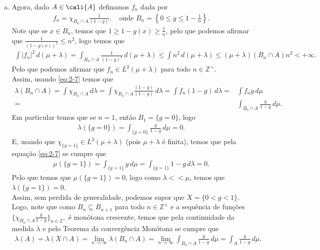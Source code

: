 \begin{homeworkProblem}[7]
\begin{solution}
\begin{enumerate}[a)]
      Assim, concluimos que $0\leq g\leq 1$ $\lambda$-q.t.p em todo o $X$.
    \item Agora, dado $A\in\cali{A}$ definamos $f_n$ dada por
      \begin{align*}
        f_n=\chi_{B_n\cap A}\frac{1}{(1-g)},\quad\text{onde }B_n=\left\{ 0\leq g\leq 1-\frac{1}{n} \right\}.
      \end{align*}
      Note que se $x\in B_n$, temos que $1\geq 1-g(x)\geq \frac{1}{n}$, pelo que podemos afirmar que $\frac{1}{(1-g(x))^{2}}\leq n^{2}$, logo temos que
      \begin{align*}
        \int |f_n|^{2}\,d(\mu+\lambda)=\int_{B_n\cap A}\frac{1}{(1-g)^{2}}\,d(\mu+\lambda)\leq \int n^{2}\,d(\mu+\lambda)\leq (\mu+\lambda)(B_n\cap A)n^{2}<+\infty.
      \end{align*}
      Pelo que podemos afirmar que $f_n\in L^{2}(\mu+\lambda)$ para todo $n\in\mathbb{Z}^{+}$.\\
      Assim, usando \eqref{eq:2-7} temos que
      \begin{align*}
        \lambda(B_n\cap A)=\int \chi_{B_n\cap A}\,d\lambda=\int \chi_{B_n\cap A}\frac{(1-g)}{(1-g)}\,d\lambda=\int f_n(1-g)\,d\lambda=&\int f_ng\,d\mu\\
        =&\int_{B_n\cap A}\frac{g}{1-g}\,d\mu.
      \end{align*}
      Em particular temos que se $n=1$, então $B_1=\{g=0\}$, logo
      \begin{align*}
        \lambda(\{g=0\})=\int_{\{g=0\}}\frac{g}{1-g}\,d\mu=0.
      \end{align*}
      E, usando que $\chi_{\{g=1\}}\in L^{2}(\mu+\lambda)$ (pois $\mu+\lambda$ é finita), temos que pela equação \eqref{eq:2-7} se cumpre que
      \begin{align*}
        \mu(\{g=1\})=\int_{\{g=1\}}g\,d\mu=\int_{\{g=1\}}1-g\,d\lambda =0.
      \end{align*}
      Pelo que temos que $\mu(\{g=1\})=0$, logo como $\lambda<<\mu$, temos que $\lambda(\{g=1\})=0$.\\
      Assim, sem perdida de generalidade, podemos supor que $X=\{0<g<1\}$. Logo, note que como $B_n\subseteq B_{n+1}$ para todo $n\in\mathbb{Z}^{+}$ e a sequência de funções $\{\chi_{B_n\cap A}\frac{g}{1-g}\}_{n\in\mathbb{Z}^{+}}$ é monótona crescente, temos que pela continuidade da medida $\lambda$ e pelo Teorema da convergência Monótona se cumpre que
      \begin{align*}
        \lambda(A)=\lambda(X\cap A)=\lim_{n \to \infty}\lambda(B_n\cap A)=\lim_{n \to \infty}\int_{B_n\cap A}\frac{g}{1-g}\,d\mu=\int_{A}\frac{g}{1-g}\,d\mu.

\end{align*}
\end{enumerate}
\end{solution}
\end{homeworkProblem}
